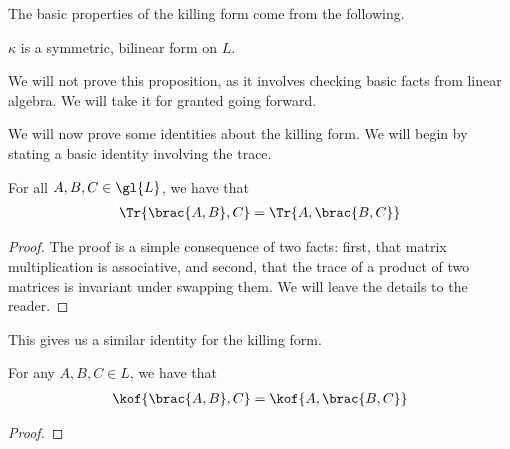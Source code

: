 The basic properties of the killing form come from the following.

\begin{boxproposition}
    $\kappa$ is a symmetric, bilinear form on $L$.
\end{boxproposition}

We will not prove this proposition, as it involves checking basic facts from linear algebra. We will take it for granted going forward.

\begin{comment}
Recall that we can assocate to any symmetric, bilinear form a symmetric matrix of it applied to any basis of a vector space. Denote
\begin{align}
    B := \begin{bmatrix}
        \kof{e_1, e_1} & \cdots & \kof{e_1, e_n} \\
        \vdots & \ddots & \vdots \\
        \kof{e_n, e_1} & \cdots & \kof{e_n, e_n}
    \end{bmatrix}
\end{align}
where $\set{e_1, \ldots, e_n}$ is a basis of $L$ and $n$ is its $\C$-dimension. Indeed, we can diagonalise $B$ by orthogonalising $\set{e_1, \ldots, e_n}$ with respect to $\kappa$ using the Gram-Schmidt process. Therefore, we may assume, without loss of generality, that $B$ is diagonal.
\end{comment}

We will now prove some identities about the killing form. We will begin by stating a basic identity involving the trace.

\begin{lemma}\label{Ch2:Lemma:TraceAssoc}
    For all $A, B, C \in \gl{L}$, we have that
    \begin{align}
        \Tr{\brac{A, B}, C} = \Tr{A, \brac{B, C}}
        \label{Ch2:Eq:TraceAssoc}
    \end{align}
\end{lemma}
\begin{proof}
    The proof is a simple consequence of two facts: first, that matrix multiplication is associative, and second, that the trace of a product of two matrices is invariant under swapping them. We will leave the details to the reader.
\end{proof}

This gives us a similar identity for the killing form.
\begin{boxcorollary}\label{Ch2:Cor:KillingAssoc}
    For any $A, B, C \in L$, we have that
    \begin{align}
        \kof{\brac{A, B}, C} = \kof{A, \brac{B, C}}
        \label{Ch2:Eq:KillingAssoc}
    \end{align}
\end{boxcorollary}
\begin{proof}

    \sorry  %
\end{proof}

